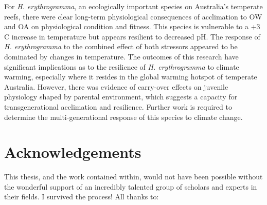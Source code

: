 \documentclass[
  oneside, 11pt, a4paper]{memoir}
\begin{document}
For \textit{H. erythrogramma}, an ecologically important species on Australia's temperate reefs, there were clear long-term physiological consequences of acclimation to OW and OA on physiological condition and fitness. 
This species is vulnerable to a +3 \degree C increase in temperature but appears resilient to decreased pH.
The response of \textit{H. erythrogramma} to the combined effect of both stressors appeared to be dominated by changes in temperature.
The outcomes of this research have significant implications as to the resilience of \textit{H. erythrogramma} to climate warming, especially where it resides in the global warming hotspot of temperate Australia.
However, there was evidence of carry-over effects on juvenile physiology shaped by parental environment, which suggests a capacity for transgenerational acclimation and resilience. 
Further work is required to determine the multi-generational response of this species to climate change.




\clearpage


\SingleSpacing

\chapter*{Acknowledgements}

\OnehalfSpacing

This thesis, and the work contained within, would not have been possible without the wonderful support of an incredibly talented group of scholars and experts in their fields. I survived the process! All thanks to:
\end{document}
